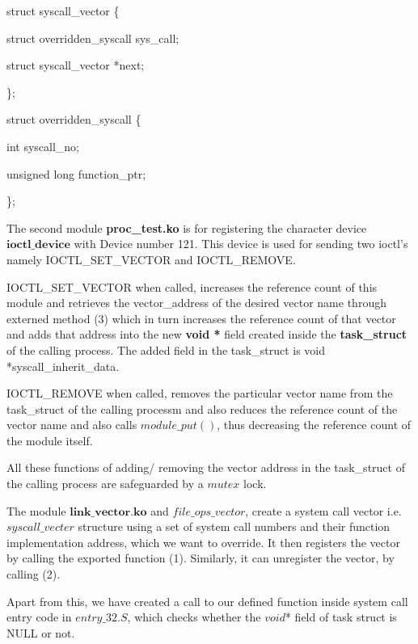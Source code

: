 \documentclass[11pt]{article}
\begin{document}
\medskip
\noindent
struct syscall\_vector \{  

\hspace{3.2cm}struct overridden\_syscall sys\_call;

\hspace{3.2cm}struct syscall\_vector *next;	

\hspace{3.0cm}\};

\bigskip
\noindent
struct overridden\_syscall \{

\hspace{3.7cm}int syscall\_no;

\hspace{3.7cm}unsigned long function\_ptr;

\hspace{3.5cm}\};


\medskip
\noindent
The second module \textbf{proc\_test.ko} is for registering the character device $\textbf{ioctl\_device}$ with Device number 121.
This device is used for sending two ioctl's namely IOCTL\_SET\_VECTOR and IOCTL\_REMOVE. 

\medskip
IOCTL\_SET\_VECTOR when called, increases the reference count of this module and retrieves the vector\_address
of the desired vector name through externed method (3) which in turn increases the reference count of that vector and adds that address into the new \textbf{void *} field created  inside the \textbf{task\_struct} of the calling process. The added field in the task\_struct is void *syscall\_inherit\_data.

IOCTL\_REMOVE when called, removes the particular vector name from the task\_struct of the calling processm and also 
 reduces the reference count of the vector name and also calls $module\_put()$, thus decreasing the reference count of the
module itself.

\medskip
\noindent
All these functions of adding/ removing the vector address in the task\_struct of the calling process are safeguarded by
a $mutex$ lock.

\medskip
\noindent
The module $\textbf{link\_vector.ko}$ and $file\_ops\_vector$, create a system call vector i.e. $syscall\_vecter$ structure using a set of  system call numbers and their function implementation address, which we want to override. It then registers
the vector by calling the exported function (1). Similarly, it can unregister the vector, by calling (2).

Apart from this, we have created a call to our defined function inside system call entry code in $entry\_32.S$, which checks
whether the $void $* field of task struct is NULL or not. 
\end{document}
